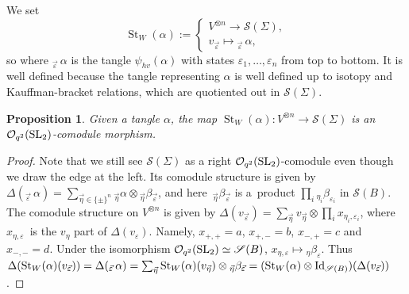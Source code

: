 \documentclass[pdftex]{sigma}%
\numberwithin{equation}{section}
\newtheorem{Proposition}[Theorem]{Proposition}
 { \theoremstyle{definition}
\newtheorem{Definition}[Theorem]{Definition}
\newtheorem{Note}[Theorem]{Note}
\newtheorem{Example}[Theorem]{Example}
\newtheorem{Remark}[Theorem]{Remark} }
\newcommand{\St}{\operatorname{St}}
\newcommand{\Oq}{\mathcal{O}_{q^2}({\rm SL}_2)}
\begin{document}
\begin{Definition}
We set
\[
\St_W(\alpha) := \begin{cases}
V^{\otimes n} \to \mathscr{S}(\Sigma),
\\
v_{\vec{\varepsilon}} \mapsto {}_{\vec{\varepsilon}}\,\alpha,
\end{cases}
\]
so where ${}_{\vec{\varepsilon}}\,\alpha$ is the tangle $\psi_{hv}(\alpha)$ with states $\varepsilon_1,\dots,\varepsilon_n$ from top to bottom. It is well defined because the tangle representing $\alpha$ is well defined up to isotopy and Kauffman-bracket relations, which are quotiented out in $\mathscr{S}(\Sigma)$.
\end{Definition}

\begin{Proposition}\label{propStOqmorph}
Given a tangle $\alpha$, the map $\St_W(\alpha)\colon V^{\otimes n}\to\mathscr{S}(\Sigma)$ is an $\Oq$-comodule morphism.
\end{Proposition}
\begin{proof}
Note that we still see $\mathscr{S}(\Sigma)$ as a right $\Oq$-comodule even though we draw the edge at the left. Its comodule structure is given by $\Delta(_{\vec{\varepsilon}}\,\alpha) = \sum_{\vec{\eta} \in \{\pm\}^n} {}_{\vec{\eta}}\alpha \otimes {}_{\vec{\eta}}\beta_{\vec{\varepsilon}}$, and here~${}_{\vec{\eta}}\beta_{\vec{\varepsilon}}$ is a~product $\prod_i {}_{\eta_i}\beta_{\varepsilon_i}$ in $\mathscr{S}(B)$. The comodule structure on $V^{\otimes n}$ is given by $\Delta(v_{\vec{\varepsilon}}) = \sum_{\vec{\eta}} v_{\vec{\eta}} \otimes \prod_i x_{\eta_i,\varepsilon_i}$, where $x_{\eta,\varepsilon}$~is the $v_\eta$ part of $\Delta(v_\varepsilon)$. Namely, $x_{+,+} = a$, $x_{+,-}=b$, $x_{-,+}=c$ and $x_{-,-}=d$. Under the isomorphism $\Oq \simeq \mathscr{S}(B)$, $x_{\eta,\varepsilon}\mapsto {}_\eta\beta_{\varepsilon}$.
 Thus $\Delta(\St_W(\alpha)(v_{\vec{\varepsilon}})) = \Delta(_{\vec{\varepsilon}}\,\alpha) = \sum_{\vec{\eta}} \St_W(\alpha)(v_{\vec{\eta}}) \otimes {}_{\vec{\eta}}\beta_{\vec{\varepsilon}} = (\St_W(\alpha)\otimes {\rm Id}_{\mathscr{S}(B)})(\Delta(v_{\vec{\varepsilon}}))$.
\end{proof}
\end{document}
